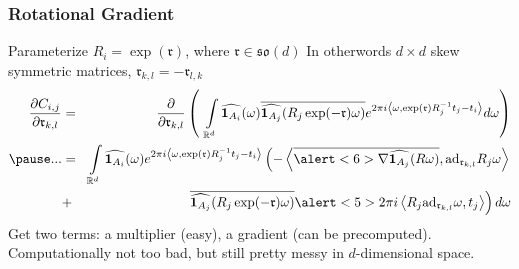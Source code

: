 \documentclass{beamer}
\begin{document}
\begin{frame}
\frametitle{Rotational Gradient}
\newcommand{\rr}{\mathfrak{r}}
Parameterize $R_i = \exp( \mathfrak{r} )$, where $\rr \in \mathfrak{so}(d)$ \vskip2pt
\hskip5pt{\small In otherwords $d \times d$ skew symmetric matrices, $\rr_{k,l} = -\rr_{l,k}$}
\pause
\begin{eqnarray*}
\frac{\partial C_{i,j}}{\partial \rr_{k,l}}  
& = &
 \frac{ \partial }{ \partial \rr_{k,l} } \left( \:\: 
	\int \limits_{\R^d} 
		\widehat{\ind{A_i}}(\omega) 
		\overline{\widehat{\ind{A_j}}(R_j \exp(-\rr) \omega)} 
		e^{2 \pi i \inner{\omega}{\exp(\rr) R_j^{-1} t_j - t_i}} 
	d \omega  
\right )\\
\pause
...
& = &
	\int \limits_{\R^d} 
		\widehat{\ind{A_i}}(\omega) e^{2 \pi i \inner{\omega}{\exp(\rr) R_j^{-1} t_j - t_i}} 
		\left(
			-\inner{\overline{\alert<6>{\nabla \widehat{\ind{A_j}}(R \omega)}}  }{ \text{ad}_{\rr_{k,l}} R_j \omega } 
		\right. \\
& + & 	\left. 
			\overline{\widehat{\ind{A_j}}(R_j \exp(-\rr) \omega)} 
			\alert<5>{2 \pi i \inner{R_j \text{ad}_{\rr_{k,l}} \omega}{  t_j} }
		\right)
	d \omega
\end{eqnarray*}
\pause
Get two terms: \pause \alert<5>{a multiplier (easy)}, \pause \alert<6>{a gradient (can be precomputed)}.
\pause
\vskip10pt
Computationally not too bad, but still pretty messy in $d$-dimensional space.
\end{frame}

\end{document}
